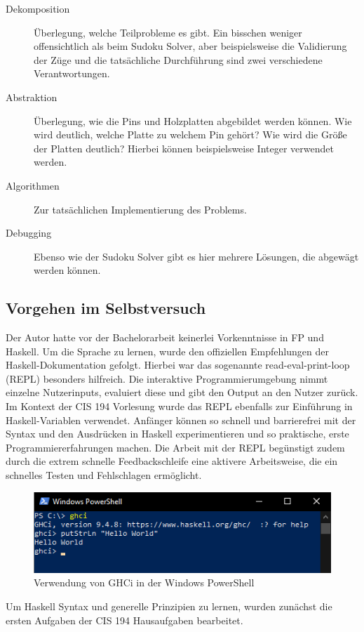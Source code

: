 \begin{description}
    \item[Dekomposition] Überlegung, welche Teilprobleme es gibt. Ein bisschen weniger offensichtlich als beim Sudoku Solver, aber beispielsweise die Validierung der Züge und die tatsächliche Durchführung sind zwei verschiedene Verantwortungen.
    \item[Abstraktion] Überlegung, wie die Pins und Holzplatten abgebildet werden können. Wie wird deutlich, welche Platte zu welchem Pin gehört? Wie wird die Größe der Platten deutlich? Hierbei können beispielsweise Integer verwendet werden.
    \item[Algorithmen] Zur tatsächlichen Implementierung des Problems.
    \item[Debugging] Ebenso wie der Sudoku Solver gibt es hier mehrere Lösungen, die abgewägt werden können.
\end{description}

\subsection{Vorgehen im Selbstversuch}
Der Autor hatte vor der Bachelorarbeit keinerlei Vorkenntnisse in FP und Haskell. Um die Sprache zu lernen, wurde den offiziellen Empfehlungen der Haskell-Dokumentation gefolgt. Hierbei war das sogenannte read-eval-print-loop (REPL) besonders hilfreich. Die interaktive Programmierumgebung nimmt einzelne Nutzerinputs, evaluiert diese und gibt den Output an den Nutzer zurück. Im Kontext der CIS 194 Vorlesung wurde das REPL ebenfalls zur Einführung in Haskell-Variablen verwendet.
Anfänger können so schnell und barrierefrei mit der Syntax und den Ausdrücken in Haskell experimentieren und so praktische, erste Programmiererfahrungen machen.
Die Arbeit mit der REPL begünstigt zudem durch die extrem schnelle Feedbackschleife eine aktivere Arbeitsweise, die ein schnelles Testen und Fehlschlagen ermöglicht.

\begin{figure}[H]
    \centering
    \includegraphics[width=1\linewidth]{Figures/Anhang/ghci}
    \caption{Verwendung von GHCi in der Windows PowerShell}
\end{figure}

Um Haskell Syntax und generelle Prinzipien zu lernen, wurden zunächst die ersten Aufgaben der CIS 194 Hausaufgaben bearbeitet.